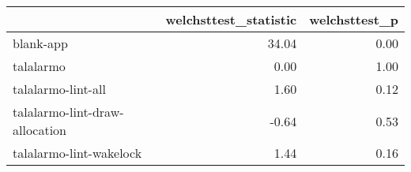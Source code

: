 \begin{tabular}{lrr}
\toprule
{} &  welchsttest\_statistic &  welchsttest\_p \\
\midrule
blank-app                      &                  34.04 &           0.00 \\
talalarmo                      &                   0.00 &           1.00 \\
talalarmo-lint-all             &                   1.60 &           0.12 \\
talalarmo-lint-draw-allocation &                  -0.64 &           0.53 \\
talalarmo-lint-wakelock        &                   1.44 &           0.16 \\
\bottomrule
\end{tabular}
